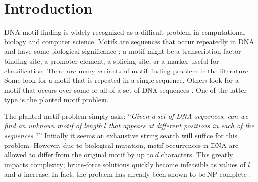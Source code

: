 \documentclass{acm_proc_article-sp}
\begin{document}
\section{Introduction}
	DNA motif finding is widely recognized as a difficult problem in computational biology and computer science. Motifs are sequences that occur repeatedly in DNA and have some biological significance \cite{das2007survey}; a motif might be a transcription factor binding site, a promoter element, a splicing site, or a marker useful for classification. There are many variants of motif finding problem in the literature. Some look for a motif that is repeated in a single sequence. Others look for a motif that occurs over some or all of a set of DNA sequences \cite{dasari2010efficient}. One of the latter type is the planted motif problem.


	The planted motif problem simply asks: ``\emph{Given a set of DNA sequences, can we find an unknown motif of length $l$ that appears at different positions in each of the sequences} \cite{pevzner2000combinatorial}?'' Initially it seems an exhaustive string search will suffice for this problem. However, due to biological mutation, motif occurrences in DNA are allowed to differ from the original motif by up to $d$ characters. This greatly impacts complexity; brute-force solutions quickly become infeasible as values of $l$ and $d$ increase. In fact, the problem has already been shown to be NP-complete \cite{pms2014}. 
\end{document}
